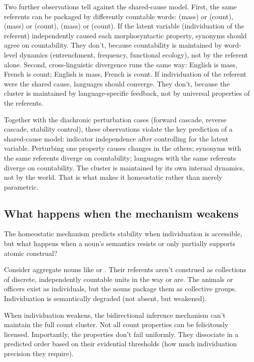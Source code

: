 \documentclass[12pt,a4paper]{article}
\begin{document}
Two further observations tell against the shared-cause model. First, the same referents can be packaged by differently countable words:  (mass) or  (count),  (mass) or  (count),  (mass) or  (count). If the latent variable (individuation of the referent) independently caused each morphosyntactic property, synonyms should agree on countability. They don't, because countability is maintained by word-level dynamics (entrenchment, frequency, functional ecology), not by the referent alone. Second, cross-linguistic divergence runs the same way: English  is mass, French  is count; English  is mass, French  is count. If individuation of the referent were the shared cause, languages should converge. They don't, because the cluster is maintained by language-specific feedback, not by universal properties of the referents.

Together with the diachronic perturbation cases (forward cascade, reverse cascade, stability control), these observations violate the key prediction of a shared-cause model: indicator independence after controlling for the latent variable. Perturbing one property causes changes in the others; synonyms with the same referents diverge on countability; languages with the same referents diverge on countability. The cluster is maintained by its own internal dynamics, not by the world. That is what makes it homeostatic rather than merely parametric.

\subsection{What happens when the mechanism weakens}\label{sec:weakening}

The homeostatic mechanism predicts stability when individuation is accessible, but what happens when a noun's semantics resists or only partially supports atomic construal?

Consider aggregate nouns like  or . Their referents aren't construed as collections of discrete, independently countable units in the way  or  are. The animals or officers exist as individuals, but the nouns package them as collective groups. Individuation is semantically degraded (not absent, but weakened).

When individuation weakens, the bidirectional inference mechanism can't maintain the full count cluster. Not all count properties can be felicitously licensed. Importantly, the properties don't fail uniformly. They dissociate in a predicted order based on their evidential thresholds (how much individuation precision they require).
\end{document}
